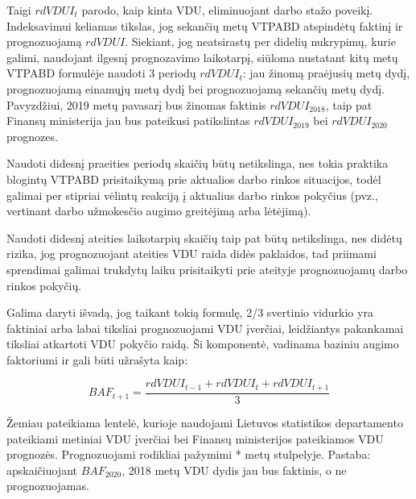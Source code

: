 \documentclass[titlepage, 11pt]{article}
\begin{document}
Taigi $rdVDUI_t$ parodo, kaip kinta VDU, eliminuojant darbo stažo poveikį. Indeksavimui keliamas tikslas, jog sekančių metų VTPABD atspindėtų  faktinį ir prognozuojamą $rdVDUI$. Siekiant, jog neatsirastų per didelių nukrypimų, kurie galimi, naudojant ilgesnį prognozavimo laikotarpį, siūloma nustatant kitų metų VTPABD formulėje naudoti 3 periodų $rdVDUI_t$: jau žinomą praėjusių metų dydį, prognozuojamą einamųjų metų dydį bei prognozuojamą sekančių metų dydį. Pavyzdžiui, 2019 metų pavasarį bus žinomas faktinis $rdVDUI_{2018}$, taip pat Finansų ministerija jau bus pateikusi patikslintas $rdVDUI_{2019}$ bei $rdVDUI_{2020}$ prognozes. 

Naudoti didesnį praeities periodų skaičių būtų netikslinga, nes tokia praktika blogintų VTPABD prisitaikymą prie aktualios darbo rinkos situacijos, todėl galimai per stipriai vėlintų reakciją į aktualius darbo rinkos pokyčius (pvz., vertinant darbo užmokesčio augimo greitėjimą arba lėtėjimą).

Naudoti didesnį ateities laikotarpių  skaičių taip pat būtų netikslinga, nes  didėtų rizika, jog prognozuojant ateities VDU raida didės paklaidos, tad priimami sprendimai galimai trukdytų laiku prisitaikyti prie ateityje prognozuojamų darbo rinkos pokyčių.

Galima daryti išvadą, jog taikant tokią formulę, 2/3 svertinio vidurkio yra faktiniai arba labai tiksliai prognozuojami VDU įverčiai, leidžiantys pakankamai tiksliai atkartoti VDU pokyčio raidą. 
Ši komponentė, vadinama baziniu augimo faktoriumi ir gali būti užrašyta kaip: 

\begin{equation}
BAF_{t+1}=\frac{rdVDUI_{t-1}+rdVDUI_{t}+rdVDUI_{t+1}}{3}
\end{equation}

Žemiau pateikiama lentelė, kurioje naudojami Lietuvos statistikos departamento pateikiami metiniai VDU įverčiai bei Finansų ministerijos pateikiamos VDU prognozės. Prognozuojami rodikliai pažymimi * metų stulpelyje. Pastaba: apskaičiuojant $BAF_{2020}$, 2018 metų VDU dydis jau bus faktinis, o ne prognozuojamas.
\end{document}
